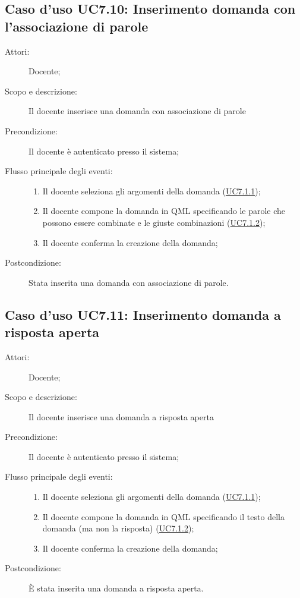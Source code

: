 \subsection{Caso d'uso UC7.10: Inserimento domanda con l'associazione di parole}\begin{description}
\item[Attori:] Docente;
\item[Scopo e descrizione:] Il docente inserisce una domanda con associazione di parole
      \item[Precondizione:] Il docente è autenticato presso il sistema;

        \item[Flusso principale degli eventi:] \begin{enumerate}
          \item Il docente seleziona gli argomenti della domanda (\hyperlink{UC7.1.1}{UC7.1.1});
          \item Il docente compone la domanda in QML specificando le parole che possono essere combinate e le giuste combinazioni (\hyperlink{UC7.1.2}{UC7.1.2});
          \item Il docente conferma la creazione della domanda;

      \end{enumerate}
    \item[Postcondizione:] Stata inserita una domanda con associazione di parole.
  \end{description}
\hypertarget{UC7.11}{}
\subsection{Caso d'uso UC7.11: Inserimento domanda a risposta aperta}\begin{description}
\item[Attori:] Docente;
\item[Scopo e descrizione:] Il docente inserisce una domanda a risposta aperta
      \item[Precondizione:] Il docente è autenticato presso il sistema;

        \item[Flusso principale degli eventi:] \begin{enumerate}
          \item Il docente seleziona gli argomenti della domanda (\hyperlink{UC7.1.1}{UC7.1.1});
          \item Il docente compone la domanda in QML specificando il testo della domanda (ma non la risposta) (\hyperlink{UC7.1.2}{UC7.1.2});
          \item Il docente conferma la creazione della domanda;

      \end{enumerate}
    \item[Postcondizione:] È stata inserita una domanda a risposta aperta.
  \end{description}
\hypertarget{UC8}{}
